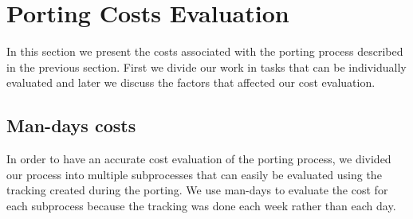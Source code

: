 \section{Porting Costs Evaluation}

%
%

In this section we present the costs associated with the porting process
described in the previous section. First we divide our work in tasks that can
be individually evaluated and later we discuss the factors that affected our
cost evaluation.

\subsection{Man-days costs}

In order to have an accurate cost evaluation of the porting process, we divided
our process into multiple subprocesses that can easily be evaluated using the
tracking created during the porting. We use man-days to evaluate the
cost for each subprocess because the tracking was done each week rather than
each day.

